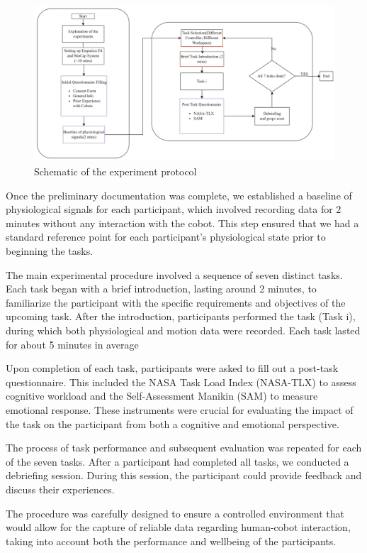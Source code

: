 \begin{figure}[h]
	\centering
	\includegraphics[width=1.15\columnwidth]{images/expflow.png}
	\caption{Schematic of the experiment protocol}
	\label{fig:prot}
\end{figure}

Once the preliminary documentation was complete, we established a baseline of physiological signals for each participant, which involved recording data for 2 minutes without any interaction with the cobot. This step ensured that we had a standard reference point for each participant's physiological state prior to beginning the tasks.

The main experimental procedure involved a sequence of seven distinct tasks. Each task began with a brief introduction, lasting around 2 minutes, to familiarize the participant with the specific requirements and objectives of the upcoming task. After the introduction, participants performed the task (Task i), during which both physiological and motion data were recorded. Each task lasted for about 5 minutes in average

Upon completion of each task, participants were asked to fill out a post-task questionnaire. This included the NASA Task Load Index (NASA-TLX) to assess cognitive workload and the Self-Assessment Manikin (SAM) to measure emotional response. These instruments were crucial for evaluating the impact of the task on the participant from both a cognitive and emotional perspective.

The process of task performance and subsequent evaluation was repeated for each of the seven tasks. After a participant had completed all tasks, we conducted a debriefing session. During this session, the participant could provide feedback and discuss their experiences. 

The procedure was carefully designed to ensure a controlled environment that would allow for the capture of reliable data regarding human-cobot interaction, taking into account both the performance and wellbeing of the participants.